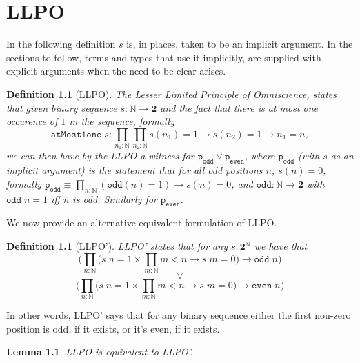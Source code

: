 \documentclass[12pt]{report}
\newtheorem{defn}[thm]{Definition}
\newtheorem{lem}[thm]{Lemma}
\begin{document}
\chapter{LLPO}
In the following definition $s$ is, in places, taken to be an implicit argument. 
In the sections to follow, terms and types that use it implicitly, are supplied with explicit arguments when the need to be clear arises. 
\begin{defn}[LLPO]\label{LLPO}
The Lesser Limited Principle of Omniscience, states that given binary sequence $s : \mathbb{N} \rightarrow \mathbf{2}$ and the fact that there is at most one occurence of $1$ in the sequence, formally 
$$\mathtt{atMost1one}\; s :\prod_{n_1 : \mathbb{N}} \prod_{n_2 : \mathbb{N}} s(n_1) = 1 \rightarrow s(n_2)= 1 \rightarrow n_1 = n_2$$
we can then have by the LLPO a witness for $\mathtt{p_{odd}} \vee \mathtt{p_{even}}$, where $\mathtt{p_{odd}}$ (with $s$ as an implicit argument) is the statement that for all odd positions $n$, $s(n) = 0$, formally $\mathtt{p_{odd}} \equiv \prod_{n : \mathbb{N}} (\mathtt{odd}(n) = 1) \rightarrow s(n) = 0$, and $\mathtt{odd} : \mathbb{N}\rightarrow \mathbf{2}$ with $\mathtt{odd}\; n = 1$ iff $n$ is odd. 
Similarly for $\mathtt{p_{even}}$. 
\end{defn}
We now provide an alternative equivalent formulation of LLPO. 
\begin{defn}[LLPO']
LLPO' states that for any $s: \mathbf{2}^\mathbb{N}$ we have that
$$ \Big( \prod_{n : \mathbb{N}} \big( s\;n = 1 \times \prod_{m : \mathbb{N}} m < n \rightarrow s\;m=0 \big) \rightarrow \mathtt{odd}\;n \Big)$$
\center$$\vee$$
$$ \Big( \prod_{n : \mathbb{N}} \big( s\;n = 1 \times \prod_{m : \mathbb{N}} m < n \rightarrow s\;m=0 \big) \rightarrow \mathtt{even}\;n \Big)$$
\end{defn}
In other words, LLPO' says that for any binary sequence either the first non-zero position is odd, if it exists, or it's even, if it exists. 
\begin{lem}
LLPO is equivalent to LLPO'.
\end{lem}
\end{document}
